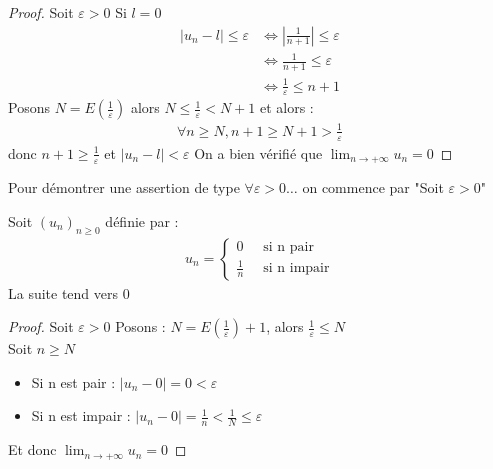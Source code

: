     \begin{proof}
    Soit $\varepsilon > 0$ 
	Si $l = 0$
	\begin{align*}
	|u_n - l| \leqslant \varepsilon &\iff \left| \frac{1}{n+1} \right| \leqslant \varepsilon \\
	&\iff \frac{1}{n+1} \leqslant \varepsilon \\
	&\iff \frac{1}{\varepsilon} \leqslant n + 1
	\end{align*}
    Posons $N = E(\frac{1}{\varepsilon})$ alors $N \leqslant \frac{1}{\varepsilon} < N + 1$
    et alors : 
    \begin{align*}
        \forall n \geqslant N, n + 1 \geqslant N + 1 > \frac{1}{\varepsilon}
    \end{align*}
    donc $n + 1 \geqslant \frac{1}{\varepsilon}$ et $|u_n - l| < \varepsilon$
    On a bien vérifié que $\displaystyle{\lim_{n \to +\infty} u_n = 0}$
    \end{proof}


    \begin{remarque}
    Pour démontrer une assertion de type $\forall \varepsilon > 0 \ldots$ on commence par "Soit $\varepsilon > 0$" 
\end{remarque}



    \begin{exemple}
    Soit $(u_n)_{n \geqslant 0}$ définie par :
    \begin{align*}
        u_n =
        \begin{cases}
            0 \ &\text{ si n pair } \\
            \frac{1}{n} \ &\text{ si n impair}
        \end{cases}
    \end{align*}
    La suite tend vers 0
    \begin{proof}
        Soit $\varepsilon > 0$
        Posons : $N = E \left(\frac{1}{\varepsilon} \right) + 1$, alors $\frac{1}{\varepsilon} \leqslant N$
        \\
        Soit $n \geqslant N$
        \begin{itemize}
            \item Si n est pair : $\left| u_n - 0 \right| = 0 < \varepsilon$
            \item Si n est impair : $\left|u_n - 0 \right| = \frac{1}{n} < \frac{1}{N} \leqslant \varepsilon$
        \end{itemize}
        Et donc $\displaystyle{\lim_{n \to +\infty} u_n = 0}$
    \end{proof}
\end{exemple}

